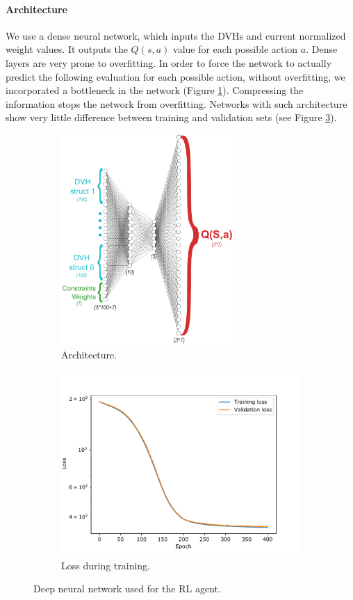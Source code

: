 \paragraph{Architecture}
We use a dense neural network, which inputs the DVHs and current normalized weight values.
It outputs the $Q(s, a)$ value for each possible action $a$.
Dense layers are very prone to overfitting.
In order to force the network to actually predict the following evaluation for each possible action, without overfitting, we incorporated a bottleneck in the network (Figure \ref{fig:architecture}).
Compressing the information stops the network from overfitting.
Networks with such architecture show very little difference between training and validation sets (see Figure \ref{fig:losses_training}).

\begin{figure}
	\centering
	\begin{subfigure}{0.48\linewidth}
		\centering
		\includegraphics[height=8cm]{AIME/architecture_all_actions.pdf}
		\caption{Architecture.}
		\label{fig:architecture}
	\end{subfigure}
	\begin{subfigure}{0.48\linewidth}
		\centering
		\includegraphics[height=7cm]{AIME/losses-distance.pdf}
		\caption{Loss during training.}
		\label{fig:losses_training}
	\end{subfigure}
	\caption{Deep neural network used for the RL agent.}
\end{figure}

